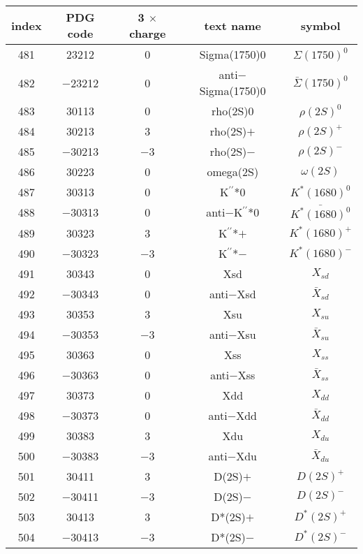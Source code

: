 \documentclass{article}
\begin{document}
\begin{table}[!htbp]
\centering
\begin{tabular}{|c|c|c|c|c|}
\hline
index & PDG code & 3 $\times$ charge & text name & symbol \\
\hline
481 & 23212 & 0 & Sigma(1750)0 & $\Sigma(1750)^{0}$ \\
\hline
482 & $-$23212 & 0 & anti$-$Sigma(1750)0 & $\bar{\Sigma}(1750)^{0}$ \\
\hline
483 & 30113 & 0 & rho(2S)0 & $\rho(2S)^{0}$ \\
\hline
484 & 30213 & 3 & rho(2S)$+$ & $\rho(2S)^{+}$ \\
\hline
485 & $-$30213 & $-$3 & rho(2S)$-$ & $\rho(2S)^{-}$ \\
\hline
486 & 30223 & 0 & omega(2S) & $\omega(2S)$ \\
\hline
487 & 30313 & 0 & K$^{\prime\prime}$*0 & $K^{*}(1680)^{0}$ \\
\hline
488 & $-$30313 & 0 & anti$-$K$^{\prime\prime}$*0 & $\bar{K^{*}(1680)^{0}}$ \\
\hline
489 & 30323 & 3 & K$^{\prime\prime}$*$+$ & $K^{*}(1680)^{+}$ \\
\hline
490 & $-$30323 & $-$3 & K$^{\prime\prime}$*$-$ & $K^{*}(1680)^{-}$ \\
\hline
491 & 30343 & 0 & Xsd & $X_{sd}$ \\
\hline
492 & $-$30343 & 0 & anti$-$Xsd & $\bar{X}_{sd}$ \\
\hline
493 & 30353 & 3 & Xsu & $X_{su}$ \\
\hline
494 & $-$30353 & $-$3 & anti$-$Xsu & $\bar{X}_{su}$ \\
\hline
495 & 30363 & 0 & Xss & $X_{ss}$ \\
\hline
496 & $-$30363 & 0 & anti$-$Xss & $\bar{X}_{ss}$ \\
\hline
497 & 30373 & 0 & Xdd & $X_{dd}$ \\
\hline
498 & $-$30373 & 0 & anti$-$Xdd & $\bar{X}_{dd}$ \\
\hline
499 & 30383 & 3 & Xdu & $X_{du}$ \\
\hline
500 & $-$30383 & $-$3 & anti$-$Xdu & $\bar{X}_{du}$ \\
\hline
501 & 30411 & 3 & D(2S)$+$ & $D(2S)^{+}$ \\
\hline
502 & $-$30411 & $-$3 & D(2S)$-$ & $D(2S)^{-}$ \\
\hline
503 & 30413 & 3 & D*(2S)$+$ & $D^{*}(2S)^{+}$ \\
\hline
504 & $-$30413 & $-$3 & D*(2S)$-$ & $D^{*}(2S)^{-}$ \\

\end{tabular}
\end{table}
\end{document}
